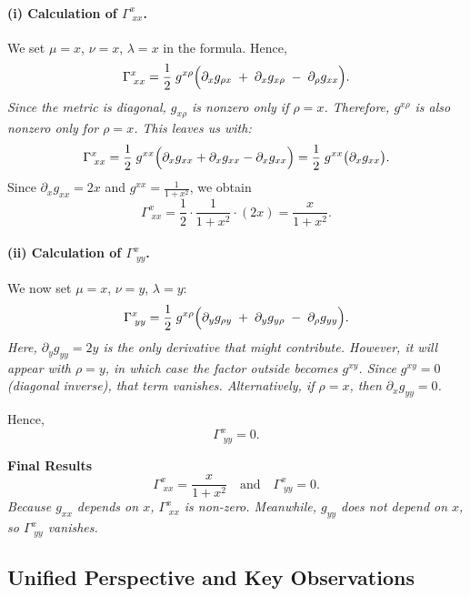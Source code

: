 \documentclass{article}
\begin{document}
\bigskip

\paragraph{(i) Calculation of \(\Gamma^x_{\;xx}\).}

\noindent
We set \(\mu = x\), \(\nu = x\), \(\lambda = x\) in the formula. Hence,
\[
\Gamma^x_{\;xx}
=
\frac{1}{2}\;g^{x\rho}
\Bigl(
\partial_x g_{\rho x}
\;+\;
\partial_x g_{x \rho}
\;-\;
\partial_\rho g_{xx}
\Bigr).
\]
\emph{Since the metric is diagonal, \(g_{x\rho}\) is nonzero only if \(\rho = x\). Therefore, \(g^{x\rho}\) is also nonzero only for \(\rho = x\). This leaves us with:}
\[
\Gamma^x_{\;xx}
=
\frac12 \; g^{xx}
\Bigl(
\partial_x g_{xx}
+ \partial_x g_{xx}
- \partial_x g_{xx}
\Bigr)
=
\frac12 \; g^{xx}
\bigl(\partial_x g_{xx}\bigr).
\]
Since \(\partial_x g_{xx} = 2x\) and \(g^{xx} = \tfrac{1}{1 + x^2}\), we obtain
\[
\Gamma^x_{\;xx}
=
\frac12 \cdot \frac{1}{1 + x^2} \cdot (2x)
=
\frac{x}{1 + x^2}.
\]

\bigskip

\paragraph{(ii) Calculation of \(\Gamma^x_{\;yy}\).}

\noindent
We now set \(\mu = x\), \(\nu = y\), \(\lambda = y\):
\[
\Gamma^x_{\;yy}
=
\frac{1}{2}\;g^{x\rho}
\Bigl(
\partial_y g_{\rho y}
\;+\;
\partial_y g_{y \rho}
\;-\;
\partial_\rho g_{yy}
\Bigr).
\]
\emph{Here, \(\partial_y g_{yy} = 2y\) is the only derivative that might contribute. However, it will appear with \(\rho = y\), in which case the factor outside becomes \(g^{xy}\). Since \(g^{xy} = 0\) (diagonal inverse), that term vanishes. Alternatively, if \(\rho = x\), then \(\partial_x g_{yy} = 0\).}

Hence,
\[
\Gamma^x_{\;yy} = 0.
\]

\bigskip

\noindent
\textbf{Final Results}
\[
\boxed{
\Gamma^x_{\;xx} = \frac{x}{1 + x^2}
\quad\text{and}\quad
\Gamma^x_{\;yy} = 0.
}
\]
\emph{Because \(g_{xx}\) depends on \(x\), \(\Gamma^x_{\;xx}\) is non-zero. Meanwhile, \(g_{yy}\) does not depend on \(x\), so \(\Gamma^x_{\;yy}\) vanishes.}

\bigskip

\subsection*{Unified Perspective and Key Observations}
\end{document}
